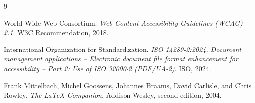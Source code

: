 \documentclass[11pt, letterpaper]{article}
\begin{document}
\clearpage

\begin{thebibliography}{9}

World Wide Web Consortium.
\newblock \emph{Web Content Accessibility Guidelines (WCAG) 2.1}.
\newblock W3C Recommendation, 2018.

International Organization for Standardization.
\newblock \emph{ISO 14289-2:2024, Document management applications -- Electronic document file format enhancement for accessibility -- Part 2: Use of ISO 32000-2 (PDF/UA-2)}.
\newblock ISO, 2024.

Frank Mittelbach, Michel Goossens, Johannes Braams, David Carlisle, and Chris Rowley.
\newblock \emph{The LaTeX Companion}.
\newblock Addison-Wesley, second edition, 2004.

\end{thebibliography}
\end{document}
